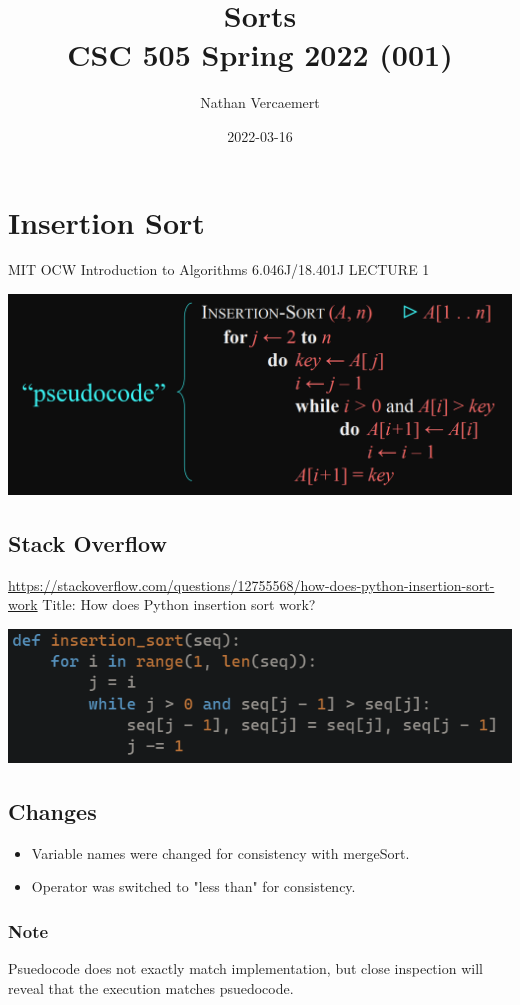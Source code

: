 \documentclass[11pt]{article}
\author{Nathan Vercaemert}
\date{2022-03-16}
\title{Sorts\\\medskip
\large CSC 505 Spring 2022 (001)}
\begin{document}
\maketitle
\tableofcontents

\section{Insertion Sort}
\label{sec:org71e274f}
MIT OCW Introduction to Algorithms 6.046J/18.401J LECTURE 1
\begin{center}
\includegraphics[width=.9\linewidth]{./Screenshot 2022-03-16 095958.png}
\end{center}
\subsection{Stack Overflow}
\label{sec:org9e8a85d}
\url{https://stackoverflow.com/questions/12755568/how-does-python-insertion-sort-work}
Title: How does Python insertion sort work?
\begin{center}
\includegraphics[width=.9\linewidth]{./Screenshot 2022-03-16 100657.png}
\end{center}
\subsection{Changes}
\label{sec:org55fd611}
\begin{itemize}
\item Variable names were changed for consistency with mergeSort.
\item Operator was switched to "less than" for consistency.
\end{itemize}
\subsubsection{Note}
\label{sec:org11e4de2}
Psuedocode does not exactly match implementation, but close inspection will reveal that the execution matches psuedocode.
\end{document}
